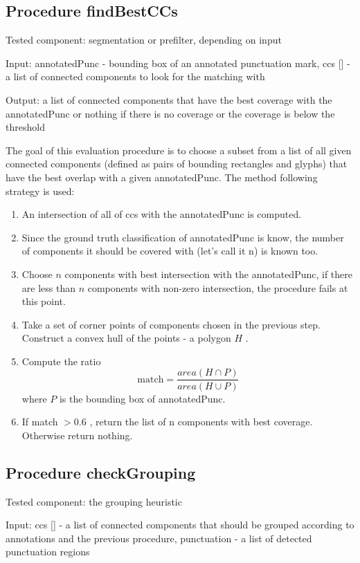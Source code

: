 \documentclass[12pt,a4paper]{report}
\begin{document}
\subsection{Procedure findBestCCs}
Tested component: segmentation or prefilter, depending on input

Input: annotatedPunc - bounding box of an annotated punctuation mark, ccs [] - a list of connected components to look for the matching with

Output: a list of connected components that have the best coverage with the annotatedPunc or nothing if there is no coverage or the coverage is below the threshold

The goal of this evaluation procedure is to choose a subset from a list of all given connected components (defined as pairs of bounding rectangles and glyphs) that have the best overlap with a given annotatedPunc. The method following strategy is used:
\begin{enumerate}
    \item An intersection of all of ccs with the annotatedPunc is computed.
    \item Since the ground truth classification of annotatedPunc is know, the number of components it should be covered with (let's call it n) is known too.
    \item Choose $n$ components with best intersection with the annotatedPunc, if there are less than $n$ components with non-zero intersection, the procedure fails at this point.
    \item Take a set of corner points of components chosen in the previous step. Construct a convex hull of the points - a polygon $H$ .
    \item Compute the ratio
    \[
    \mathrm{match} = \frac{area(H\cap P)}{area(H\cup P)}
    \]
    where $P$ is the bounding box of annotatedPunc.
    \item If match $>0.6$ , return the list of n components with best coverage. Otherwise return nothing.
\end{enumerate}

\subsection{Procedure checkGrouping}
Tested component: the grouping heuristic

Input: ccs [] - a list of connected components that should be grouped according to annotations and the previous procedure, punctuation - a list of detected punctuation regions
\end{document}
